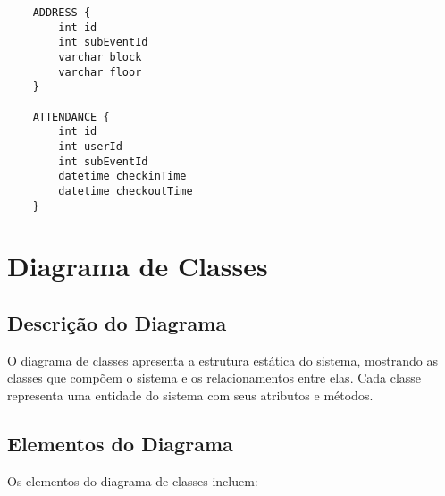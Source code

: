\begin{itemize}
\begin{description}
\begin{verbatim}
    ADDRESS {
        int id
        int subEventId
        varchar block
        varchar floor
    }

    ATTENDANCE {
        int id
        int userId
        int subEventId
        datetime checkinTime
        datetime checkoutTime
    }
\end{verbatim}

\chapter{Diagrama de Classes}

\section{Descrição do Diagrama}

O diagrama de classes apresenta a estrutura estática do sistema, mostrando as classes que compõem o sistema e os relacionamentos entre elas. Cada classe representa uma entidade do sistema com seus atributos e métodos.

\section{Elementos do Diagrama}

Os elementos do diagrama de classes incluem:


\end{description}
\end{itemize}
